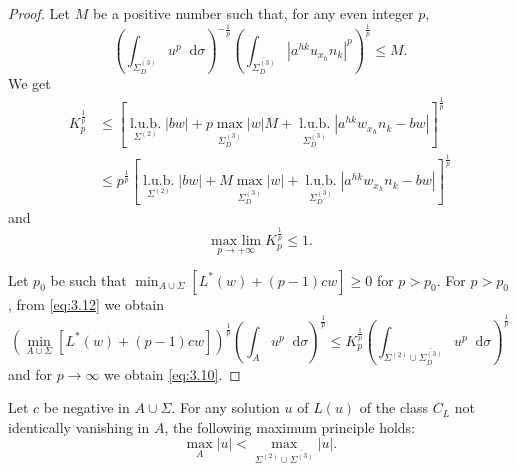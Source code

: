 \documentclass[a4paper,12pt,leqno]{article}
\numberwithin{equation}{section}
\newenvironment{thm}[1]
{\renewcommand\theinnerproblem{#1}\innerproblem}
{\endinnerproblem}
\newcommand{\dd}{\mathop{}\!\mathrm{d}}
\newcommand{\lub}[1]{\underset{#1}{\operatorname{l.u.b.}}}
\newcommand{\ovdir}{\overline{\Sigma_{D}^{(3)}}}
\begin{document}
\begin{proof}
	Let $M$ be a positive number such that, for any even integer $p$,
	\begin{equation*}
		\left(\int_{\ovdir} u^p \dd \sigma \right)^{-\frac 1p} \left(\int_{\ovdir} |a^{hk}u_{x_h}n_k|^p \right)^{\frac 1p} \leq M.
	\end{equation*}
	We get
	\begin{equation*}
		\begin{split}
			K_p^{\frac1p}
			& \leq \left[ \lub{\Sigma^{(2)}} |bw| + p \max_{\ovdir} |w|M + \lub{\ovdir} |a^{hk}w_{x_h}n_k-bw|\right]^{\frac 1p}
			\\
			& \leq p^{\frac 1p}\left[ \lub{\Sigma^{(2)}} |bw| + M \max_{\ovdir} |w| + \lub{\ovdir} |a^{hk}w_{x_h}n_k-bw|\right]^{\frac 1p}
		\end{split}
	\end{equation*}
	and
	\begin{equation*}
		\underset{p\to+\infty}{\operatorname{max~lim}} K_p^{\frac 1p} \leq 1.
	\end{equation*}

	Let $p_0$ be such that $\min_{A\cup\Sigma} [L^*(w)+(p-1)cw] \geq 0$ for $p > p_0$.
	For $p > p_0$, from \eqref{eq:3.12} we obtain
	\begin{equation*}
		\left(\min_{A\cup\Sigma}[L^*(w)+(p-1)cw]\right)^{\frac1p}
		\left(\int_A u^p \dd \sigma\right)^{\frac1p}
		\leq
		K_p^{\frac 1p}
		\left(\int_{\Sigma^{(2)}\cup\ovdir} u^p \dd\sigma\right)^{\frac1p}
	\end{equation*}
	and for $p \to \infty$ we obtain \eqref{eq:3.10}.
\end{proof}

\begin{thm}{XIII} \label{thm:XIII}
	Let $c$ be negative in $A\cup\Sigma$. 
	For any solution $u$ of $L(u)$ of the class $C_L$ not identically vanishing in $A$, the following maximum principle holds:
	\begin{equation*}
		\boxed{
			\max_A |u| < \max_{\overline{\Sigma^{(2)}} \cup \overline{\Sigma^{(3)}}} |u|.
		}
	\end{equation*}
\end{thm}
\end{document}
